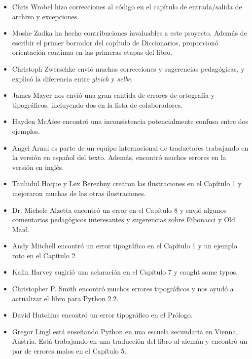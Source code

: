 \documentclass[10pt]{book}
\begin{document}
\begin{itemize}
\item Chris Wrobel hizo correcciones al código en el capítulo de
entrada/salida de archivo y excepciones.

\item Moshe Zadka ha hecho contribuciones invaluables a este proyecto.
Además de escribir el primer borrador del capítulo de Diccionarios,
proporcionó orientación continua en las primeras etapas del libro.

\item Christoph Zwerschke envió muchas correcciones y
sugerencias pedagógicas, y explicó la diferencia entre {\em gleich}
y {\em selbe}.

\item James Mayer nos envió una gran cantida de errores de ortografía
y tipográficos, incluyendo dos en la lista de colaboradores.

\item Hayden McAfee encontró una inconsistencia potencialmente confusa
entre dos ejemplos.

\item Angel Arnal es parte de un equipo internacional de traductores
trabajando en la versión en español del texto.  Además, encontró muchos
errores en la versión en inglés.

\item Tauhidul Hoque y Lex Berezhny crearon las ilustraciones
en el Capítulo 1 y mejoraron muchas de las otras ilustraciones.

\item Dr. Michele Alzetta encontró un error en el Capítulo 8 y envió
algunos comentarios pedagógicos interesantes y sugerencias sobre Fibonacci
y Old Maid.

\item Andy Mitchell encontró un error tipográfico en el Capítulo 1 y un ejemplo roto
en el Capítulo 2.

\item Kalin Harvey sugirió una aclaración en el Capítulo 7 y
caught some typos.

\item Christopher P. Smith encontró muchos errores tipográficos y nos ayudó a
actualizar el libro para Python 2.2.

\item David Hutchins encontró un error tipográfico en el Prólogo.

\item Gregor Lingl está enseñando Python en una escuela secundaria en Vienna,
Austria.  Está trabajando en una traducción del libro al alemán
y encontró un par de errores malos en el Capítulo 5.


\end{itemize}
\end{document}
